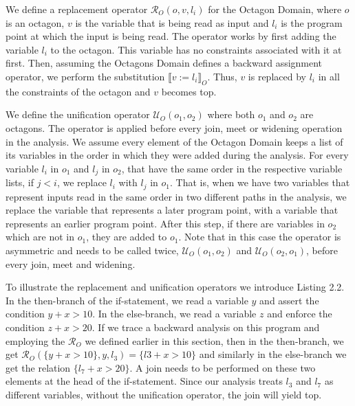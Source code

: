 \documentclass[10pt]{report}
\begin{document}
We define a replacement operator $ \mathcal{R}_{O}(o, v, l_{i}) $ for the Octagon Domain, where $ o $ is an octagon, $ v $ is the variable that is being read as input and $ l_{i} $ is the program point at which the input is being read. The operator works by first adding the variable $ l_{i} $ to the octagon. This variable has no constraints associated with it at first. Then, assuming the Octagons Domain defines a backward assignment operator, we perform the substitution $ \llbracket v := l_{i} \rrbracket_{O} $. Thus, $ v $ is replaced by $ l_{i} $ in all the constraints of the octagon and $ v $ becomes top. 


We define the unification operator $ \mathcal{U}_{O}(o_{1}, o_{2}) $ where both $ o_{1} $ and $ o_{2} $ are octagons. The operator is applied before every join, meet or widening operation in the analysis. We assume every element of the Octagon Domain keeps a list of its variables in the order in which they were added during the analysis. For every variable $ l_{i} $ in $ o_{1} $ and $ l_{j} $ in $ o_{2} $, that have the same order in the respective variable lists, if $ j < i $, we replace $ l_{i} $ with $ l_{j} $ in $ o_{1} $. That is, when we have two variables that represent inputs read in the same order in two different paths in the analysis, we replace the variable that represents a later program point, with a variable that represents an earlier program point. After this step, if there are variables in $ o_{2} $ which are not in $ o_{1} $, they are added to $ o_{1} $. Note that in this case the operator is asymmetric and needs to be called twice, $ \mathcal{U}_{O}(o_{1}, o_{2}) $ and $ \mathcal{U}_{O}(o_{2}, o_{1}) $, before every join, meet and widening. 


To illustrate the replacement and unification operators we introduce Listing 2.2. In the then-branch of the if-statement, we read a variable $ y $ and assert the condition $ y + x > 10 $. In the else-branch, we read a variable $ z $ and enforce the condition $ z + x > 20 $. If we trace a backward analysis on this program and employing the $ \mathcal{R}_{O} $ we defined earlier in this section, then in the then-branch, we get $\mathcal{R}_{O}(\lbrace y + x > 10\rbrace, y, l_{3}) = \lbrace l3 + x > 10 \rbrace$ and similarly in the else-branch we get the relation $ \lbrace l_{7} + x > 20 \rbrace$. A join needs to be performed on these two elements at the head of the if-statement. Since our analysis treats $ l_{3} $ and $ l_{7} $ as different variables, without the unification operator, the join will yield top. 
\end{document}
